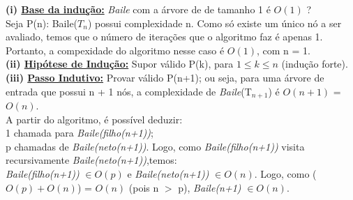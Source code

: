 \documentclass[a4paper]{article}
\begin{document}
\textbf{(i) \underline{Base da indução:}} \emph{Baile} com a árvore de de tamanho 1 é $O(1)$ ?\\
\qquad Seja P(n): Baile($T_n$) possui complexidade n. Como só existe um único nó a ser avaliado, temos que o número de iterações que o algoritmo faz é apenas 1. Portanto, a compexidade do algoritmo nesse caso é $O(1)$, com n = 1.\\

\textbf{(ii) \underline{Hipótese de Indução:}} Supor válido P(k), para $1\leq k \leq n$ (indução forte).\\

\textbf{(iii) \underline{Passo Indutivo:}} Provar válido P(n+1); ou seja, para uma árvore de entrada que possui n + 1 nós, a complexidade de \emph{Baile}(T$_{n+1}$) é $O(n+1)$ = $O(n)$.\\
A partir do algoritmo, é possível deduzir:\\
1 chamada para \emph{Baile(filho(n+1))};\\
p chamadas de \emph{Baile(neto(n+1))}. Logo, como \emph{Baile(filho(n+1))} visita recursivamente \emph{Baile(neto(n+1))},temos:\\
\emph{Baile(filho(n+1))} $\in O(p)$ e \emph{Baile(neto(n+1))} $\in O(n)$. Logo, como ($O(p) + O(n)$) = $O(n)$ (pois n $>$ p), \emph{Baile(n+1)} $\in O(n)$.
\end{document}
